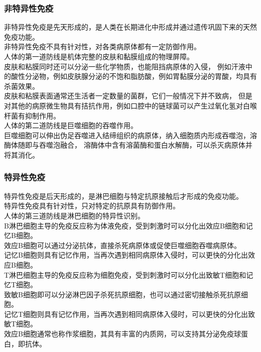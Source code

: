 \documentclass[UTF8]{ctexart}
\begin{document}
\subsubsection{非特异性免疫}
    非特异性免疫是先天形成的，是人类在长期进化中形成并通过遗传巩固下来的天然免疫功能。\\[2mm]
    非特异性免疫不具有针对性，对各类病原体都有一定防御作用。\\[3mm]
    人体的第一道防线是机体完整的皮肤和黏膜组成的物理屏障。\\[3mm]
    皮肤和粘膜同时还可以分泌一些化学物质，也能阻挡病原体的入侵，
    例如汗液中的酸性分泌物，例如皮肤腺分泌的不饱和脂肪酸，例如胃黏膜分泌的胃酸，均具有杀菌效果。\\[3mm]
    皮肤和粘膜表面通常还生活者一定数量的菌群，它们一般情况下并不致病，
    但是对其他的病原微生物具有拮抗作用，例如口腔中的链球菌可以产生过氧化氢对白喉杆菌有抑制作用。\\[3mm]
    人体的第二道防线是巨噬细胞的吞噬作用。\\[3mm]
    巨噬细胞可以伸出伪足吞噬进入结缔组织的病原体，纳入细胞质内形成吞噬泡，溶酶体随即与吞噬泡融合，
    溶酶体中含有溶菌酶和蛋白水解酶，可以杀灭病原体并将其消化。

\subsubsection{特异性免疫}
    特异性免疫是后天形成的，是淋巴细胞与特定抗原接触后才形成的免疫功能。\\[2mm]
    特异性免疫具有针对性，只对特定的抗原具有防御作用。\\[3mm]
    人体的第三道防线是淋巴细胞的特异性识别。\\[4mm]
    B淋巴细胞主导的免疫反应称为体液免疫，受到刺激时可以分化出效应B细胞和记忆B细胞。\\[2mm]
    效应B细胞可以通过分泌抗体，直接杀死病原体或促使巨噬细胞吞噬病原体。\\[2mm]
    记忆B细胞则具有记忆作用，当再次遇到相同病原体入侵时，可以更快的分化出效应B细胞。\\[4mm]
    T淋巴细胞主导的免疫反应称为细胞免疫，受到刺激时可以分化出致敏T细胞和记忆T细胞。\\[2mm]
    致敏B细胞即可以分泌淋巴因子杀死抗原细胞，也可以通过密切接触杀死抗原细胞。\\[2mm]
    记忆T细胞则具有记忆作用，当再次遇到相同病原体入侵时，可以更快的分化出致敏T细胞。\\[4mm]
    效应B细胞通常也称作浆细胞，其具有丰富的内质网，可以支持其分泌免疫球蛋白，即抗体。
\end{document}
